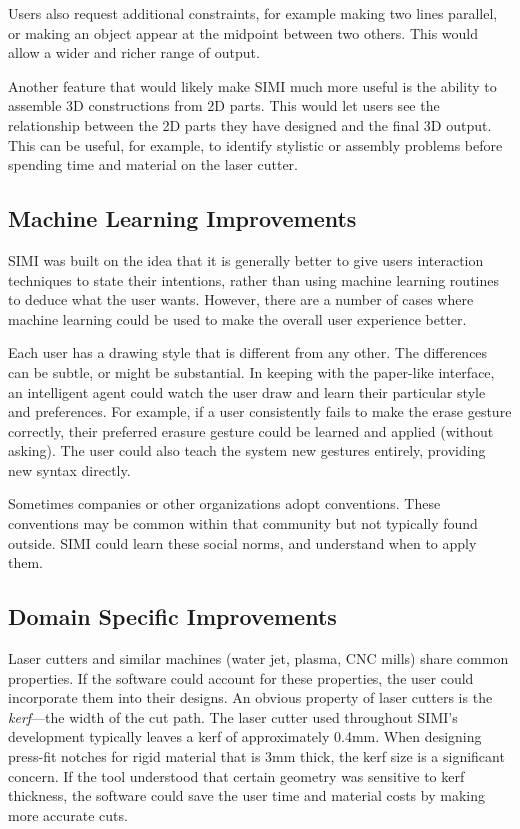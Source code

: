 Users also request additional constraints, for example making two
lines parallel, or making an object appear at the midpoint between two
others. This would allow a wider and richer range of output.

Another feature that would likely make SIMI much more useful is the
ability to assemble 3D constructions from 2D parts. This would let
users see the relationship between the 2D parts they have designed and
the final 3D output. This can be useful, for example, to identify
stylistic or assembly problems before spending time and material on
the laser cutter.

\subsection{Machine Learning Improvements}

SIMI was built on the idea that it is generally better to give users
interaction techniques to state their intentions, rather than using
machine learning routines to deduce what the user wants. However,
there are a number of cases where machine learning could be used to
make the overall user experience better.

Each user has a drawing style that is different from any other. The
differences can be subtle, or might be substantial. In keeping with
the paper-like interface, an intelligent agent could watch the user
draw and learn their particular style and preferences. For example, if
a user consistently fails to make the erase gesture correctly, their
preferred erasure gesture could be learned and applied (without
asking). The user could also teach the system new gestures entirely,
providing new syntax directly.

Sometimes companies or other organizations adopt conventions. These
conventions may be common within that community but not typically
found outside. SIMI could learn these social norms, and understand
when to apply them.

\subsection{Domain Specific Improvements}

Laser cutters and similar machines (water jet, plasma, CNC mills)
share common properties. If the software could account for these
properties, the user could incorporate them into their designs. An
obvious property of laser cutters is the \textit{kerf}---the width of
the cut path. The laser cutter used throughout SIMI's development
typically leaves a kerf of approximately 0.4mm. When designing
press-fit notches for rigid material that is 3mm thick, the kerf size
is a significant concern. If the tool understood that certain geometry
was sensitive to kerf thickness, the software could save the user time
and material costs by making more accurate cuts.


